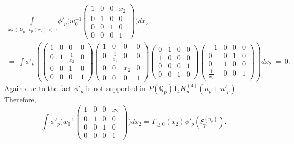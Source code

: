 \documentclass[11pt]{amsart}
\newcommand{\mirp}[1]{K_p^{(4)}(#1)}
\begin{document}
\begin{multline*}
\int\limits_{x_2 \in \mathbb{Q}_p: \,\, v_p(x_2) < 0} \phi'_p \biggl( w_0^{-1}\left(\begin{smallmatrix}
		1 & 0 & 0 & x_{2} \\
		0 & 1 & 0 & 0 \\
		0 & 0 & 1 & 0 \\
		0 & 0 & 0 & 1
	\end{smallmatrix}\right)    \biggr) dx_2 \\ 
= \ 
\int \phi'_p\left(\left(\begin{smallmatrix}
		1 & 0 & 0 & 0 \\
		0 & 1 & \frac{1}{x_{2}} & 0 \\
		0 & 0 & 1 & 0 \\
		0 & 0 & 0 & 1
	\end{smallmatrix}\right) \left(\begin{smallmatrix}
		1 & 0 & 0 & 0 \\
		0 & \frac{1}{x_{2}} & 0 & 0 \\
		0 & 0 & x_{2} & 0 \\
		0 & 0 & 0 & 1
	\end{smallmatrix}\right) \left(\begin{smallmatrix}
		0 & 1 & 0 & 0 \\
		1 & 0 & 0 & 0 \\
		0 & 0 & 0 & 1 \\
		0 & 0 & 1 & 0
	\end{smallmatrix}\right) \left(\begin{smallmatrix}
	-1 & 0 & 0 & 0 \\
	0 & 0 & 1 & 0 \\
	0 & 1 & 0 & 0 \\
	\frac{1}{x_{2}} & 0 & 0 & 1
	\end{smallmatrix}\right) \right) dx_2 
\ = \ 0.
\end{multline*}
Again due to the fact $\phi'_p$ is not supported in $P(\mathbb{Q}_p) \mathbf{1}_4 \mirp{n_p + n'_p}.$
Therefore,
\[\int \phi'_p \biggl( w_0^{-1}\left(\begin{smallmatrix}
	1 & 0 & 0 & x_{2} \\
	0 & 1 & 0 & 0 \\
	0 & 0 & 1 & 0 \\
	0 & 0 & 0 & 1
\end{smallmatrix}\right)    \biggr) dx_2 = T_{\geq 0} (x_2)\phi'_p(\xi_p^{(n_p)}).\]

\medskip
\end{document}
